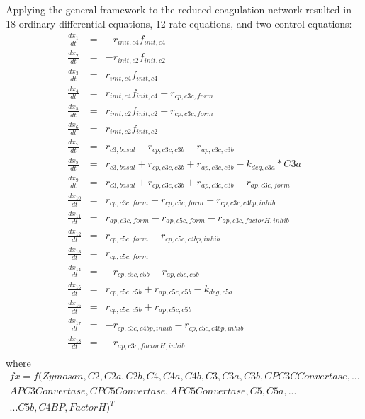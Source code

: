 \documentclass[12pt]{article}
\begin{document}
Applying the general framework to the reduced coagulation network resulted in 18 ordinary differential equations, 12 rate equations, and two control equations:
\begin{eqnarray}
	\frac{dx_{1}}{dt} & =& - r_{init,c4}f_{init,c4} \\ 								%
	\frac{dx_{2}}{dt} &=& - r_{init,c2}f_{init,c2} \\  								%
	\frac{dx_{3}}{dt} &=&  r_{init,c4}f_{init,c4} \\ 								%
	\frac{dx_{4}}{dt} &=& r_{init,c4}f_{init,c4} - r_{cp,c3c,form} \\ 					%
	\frac{dx_{5}}{dt} & = & r_{init,c2}f_{init,c2} - r_{cp,c3c,form} \\ 					%
	\frac{dx_{6}}{dt} &=& r_{init,c2}f_{init,c2} \\ 								%
	\frac{dx_{7}}{dt} &=& r_{c3,basal} - r_{cp,c3c,c3b} - r_{ap,c3c,c3b}\\ 				%
	\frac{dx_{8}}{dt} &=& r_{c3,basal}  + r_{cp,c3c,c3b} + r_{ap,c3c,c3b}  - k_{deg,c3a}*C3a \\		%
	\frac{dx_{9}}{dt} &=& r_{c3,basal}  + r_{cp,c3c,c3b} + r_{ap,c3c,c3b}  -  r_{ap,c3c,form} \\		%
	\frac{dx_{10}}{dt} &=& r_{cp,c3c,form} - r_{cp,c5c,form} -  r_{cp,c3c,c4bp,inhib} \\			%
	\frac{dx_{11}}{dt} &=& r_{ap,c3c,form} - r_{ap,c5c,form} -  r_{ap,c3c,factorH,inhib} \\			%
	\frac{dx_{12}}{dt} &=& r_{cp,c5c,form} - r_{cp,c5c,c4bp,inhib} \\							%
	\frac{dx_{13}}{dt} &=& r_{cp,c5c,form}  \\											%
	\frac{dx_{14}}{dt} &=& - r_{cp,c5c,c5b} - r_{ap,c5c,c5b} \\								%
	\frac{dx_{15}}{dt} &=&  r_{cp,c5c,c5b} + r_{ap,c5c,c5b} - k_{deg,c5a} \\					%
	\frac{dx_{16}}{dt} &=& r_{cp,c5c,c5b} + r_{ap,c5c,c5b} \\								%
	\frac{dx_{17}}{dt} &=& - r_{cp,c3c,c4bp,inhib} - r_{cp,c5c,c4bp,inhib} \\  				         %
	\frac{dx_{18}}{dt} &=& - r_{ap,c3c,factorH,inhib} \\									%
\end{eqnarray}
where \begin{multline}
f{x} = f(Zymosan,C2,C2a,C2b,C4,C4a,C4b,C3,C3a,C3b,CP C3C Convertase,... \\
           AP C3 Convertase,CP C5 Convertase,AP C5 Convertase,C5,C5a,... \\
           ... C5b,C4BP,Factor H)^{T}
\end{multline}
\end{document}
